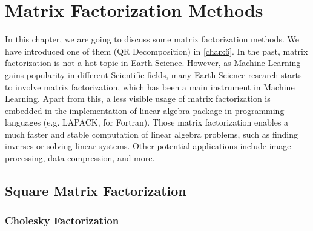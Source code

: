 \chapter{Matrix Factorization Methods}

In this chapter, we are going to discuss some matrix factorization methods. We have introduced one of them (QR Decomposition) in \autoref{chap:6}. In the past, matrix factorization is not a hot topic in Earth Science. However, as Machine Learning gains popularity in different Scientific fields, many Earth Science research starts to involve matrix factorization, which has been a main instrument in Machine Learning. Apart from this, a less visible usage of matrix factorization is embedded in the implementation of linear algebra package in programming languages (e.g. LAPACK, for Fortran). Those matrix factorization enables a much faster and stable computation of linear algebra problems, such as finding inverses or solving linear systems. Other potential applications include image processing, data compression, and more.

\section{Square Matrix Factorization}
\subsection{Cholesky Factorization}

